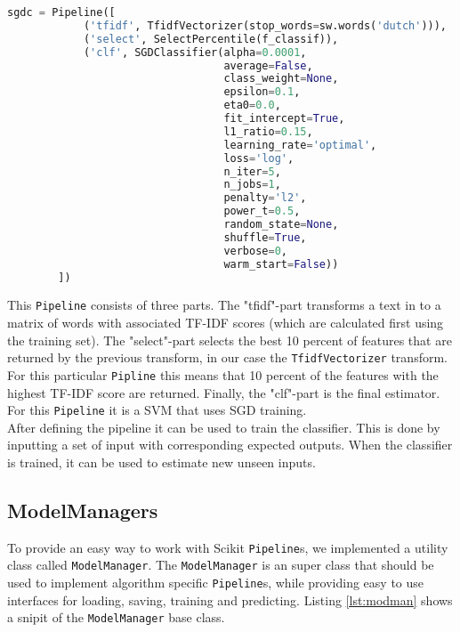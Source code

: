 \begin{lstlisting}[language=python, caption={SGDC Pipeline}, label={lst:sdgc}]
sgdc = Pipeline([
            ('tfidf', TfidfVectorizer(stop_words=sw.words('dutch'))),
            ('select', SelectPercentile(f_classif)),
            ('clf', SGDClassifier(alpha=0.0001,
                                  average=False,
                                  class_weight=None,
                                  epsilon=0.1,
                                  eta0=0.0,
                                  fit_intercept=True,
                                  l1_ratio=0.15,
                                  learning_rate='optimal',
                                  loss='log',
                                  n_iter=5,
                                  n_jobs=1,
                                  penalty='l2',
                                  power_t=0.5,
                                  random_state=None,
                                  shuffle=True,
                                  verbose=0,
                                  warm_start=False))
        ])
\end{lstlisting}
This \texttt{Pipeline} consists of three parts. The "tfidf"-part transforms a text in to a matrix of words with associated TF-IDF scores (which are calculated first using the training set). The "select"-part selects the best 10 percent of features that are returned by the previous transform, in our case the \texttt{TfidfVectorizer} transform. For this particular \texttt{Pipline} this means that 10 percent of the features with the highest TF-IDF score are returned. Finally, the "clf"-part is the final estimator. For this \texttt{Pipeline} it is a SVM that uses SGD training.\\
After defining the pipeline it can be used to train the classifier. This is done by inputting a set of input with corresponding expected outputs. When the classifier is trained, it can be used to estimate new unseen inputs. 
\subsection{ModelManagers}
To provide an easy way to work with Scikit \texttt{Pipeline}s, we implemented a utility class called \texttt{ModelManager}. The \texttt{ModelManager} is an super class that should be used to implement algorithm specific \texttt{Pipeline}s, while providing easy to use interfaces for loading, saving, training and predicting. Listing \ref{lst:modman} shows a snipit of the \texttt{ModelManager} base class.

